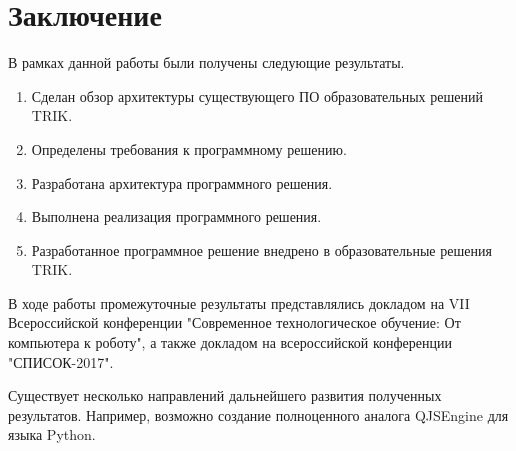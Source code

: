 \documentclass[14pt]{matmex-diploma-custom}
\begin{document}
\section*{Заключение}

В рамках данной работы были получены следующие результаты.
\begin{enumerate}
\item Сделан обзор архитектуры существующего ПО образовательных решений TRIK.
\item Определены требования к программному решению.
\item Разработана архитектура программного решения.
\item Выполнена реализация программного решения.
\item Разработанное программное решение внедрено в образовательные решения TRIK.
\end{enumerate}


В ходе работы промежуточные результаты представлялись докладом на VII Всероссийской конференции "Современное технологическое обучение: От компьютера к роботу", а также докладом на всероссийской конференции "СПИСОК-2017".

Существует несколько направлений дальнейшего развития полученных результатов. Например, возможно создание полноценного аналога QJSEngine для языка Python.

\setmonofont[Mapping=tex-text]{CMU Typewriter Text}


\end{document}
